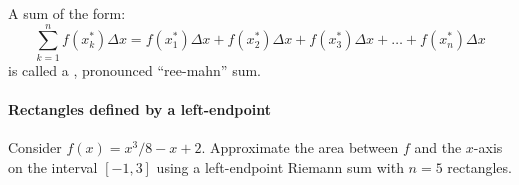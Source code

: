 \documentclass{ximera}
\begin{document}
\begin{definition}
  A sum of the form:
  \[
  \sum_{k=1}^n  f(x_k^*)\Delta x  = f(x_1^*)\Delta x +  f(x_2^*)\Delta x +   f(x_3^*)\Delta x + \dots +   f(x_n^*)\Delta x
  \]
  is called a , pronounced ``ree-mahn'' sum.
\end{definition}



\paragraph{Rectangles defined by a left-endpoint}

\begin{example}
  Consider $f(x) = x^3/8-x+2$. Approximate the area between $f$ and
  the $x$-axis on the interval $[-1,3]$ using a left-endpoint Riemann
  sum with $n=5$ rectangles.
  

\end{example}
\end{document}
